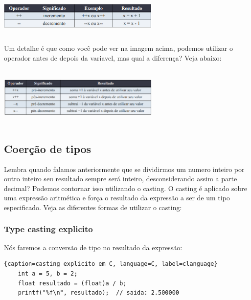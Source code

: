 \documentclass{report}
\begin{document}
	\begin{center}
		
		\includegraphics[width=8cm,height=2cm,keepaspectratio=false]{imagens/pospre.png}
		
	\end{center}
	
	Um detalhe é que como você pode ver na imagem acima, podemos utilizar o operador antes de depois da variavel, mas qual a diferença? Veja abaixo:
	
	\begin{center}
		
		\includegraphics[width=8cm,height=3cm,keepaspectratio=false]{imagens/expliqprepos.png}
		
	\end{center}
	
	\subsection{Coerção de tipos}
	Lembra quando falamos anteriormente que se dividirmos um numero inteiro por outro inteiro seu resultado sempre será inteiro, desconsiderando assim a parte decimal? Podemos contornar isso utilizando o casting. O casting é aplicado sobre uma expressão aritmética e força o resultado da expressão a ser de um tipo especificado. Veja as diferentes formas de utilizar o casting:
	
		
	
	\subsubsection{Type casting explicito}
	Nós faremos a conversão de tipo no resultado da expressão:
	
	\begin{center}
		
		\begin{lstlisting}{caption=casting explicito em C, language=C, label=clanguage}
	int a = 5, b = 2;
	float resultado = (float)a / b;
	printf("%f\n", resultado);  // saida: 2.500000
			
			
		\end{lstlisting}
	\end{center}
	
\end{document}
